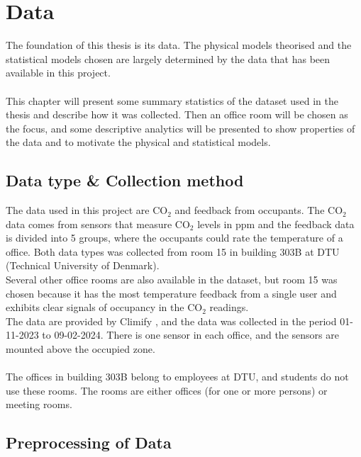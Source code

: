 \chapter{Data}
The foundation of this thesis is its data. The physical models theorised and the statistical models chosen
are largely determined by the data that has been available in this project. \\
\\
This chapter will present some summary statistics of the dataset used in the thesis and describe how it was collected. %
Then an office room will be chosen as the focus, and some descriptive analytics will be presented to show properties
of the data and to motivate the physical and statistical models.

\section{Data type \& Collection method}
The data used in this project are $\text{CO}_2$ and feedback from occupants. The $\text{CO}_2$ data comes from sensors that measure $\text{CO}_2$ levels in ppm
and the feedback data is divided into 5 groups, where the occupants could rate the temperature of a office. Both data types was collected from
room 15 in building 303B at DTU (Technical University of Denmark).\\ %
Several other office rooms are
also available in the dataset, but room 15 was chosen because it has the most temperature feedback from a single user and exhibits clear signals
of occupancy in the $\text{CO}_2$ readings.\\
The data are provided by
Climify \parencite{climify}, and the data was collected in the period 01-11-2023 to 09-02-2024. There is one sensor in each office,
and the sensors are mounted above the occupied zone.\\
\\
The offices in building 303B belong to employees at DTU, and students do not use these rooms. The rooms are
either offices (for one or more persons) or meeting rooms. \\
\section{Preprocessing of Data}
